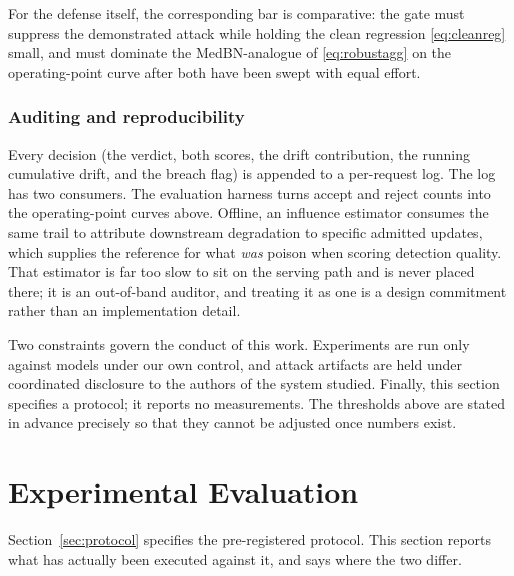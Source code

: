 \documentclass[journal]{IEEEtran}
\begin{document}
For the defense itself, the corresponding bar is comparative: the gate must suppress
the demonstrated attack while holding the clean regression \eqref{eq:cleanreg} small,
and must dominate the MedBN-analogue of \eqref{eq:robustagg} on the operating-point
curve after both have been swept with equal effort.

\subsubsection{Auditing and reproducibility}
Every decision (the verdict, both scores, the drift contribution, the running
cumulative drift, and the breach flag) is appended to a per-request log. The log
has two consumers. The evaluation harness turns accept and reject counts into the
operating-point curves above. Offline, an influence estimator consumes the same trail
to attribute downstream degradation to specific admitted updates, which supplies the
reference for what \emph{was} poison when scoring detection quality. That estimator
is far too slow to sit on the serving path and is never placed there; it is an
out-of-band auditor, and treating it as one is a design commitment rather than an
implementation detail.

Two constraints govern the conduct of this work. Experiments are run only against
models under our own control, and attack artifacts are held under coordinated
disclosure to the authors of the system studied. Finally, this section specifies a
protocol; it reports no measurements. The thresholds above are stated in advance
precisely so that they cannot be adjusted once numbers exist.

%
%

\section{Experimental Evaluation}
\label{sec:setup}

Section~\ref{sec:protocol} specifies the pre-registered protocol. This section
reports what has actually been executed against it, and says where the two
differ.
\end{document}
